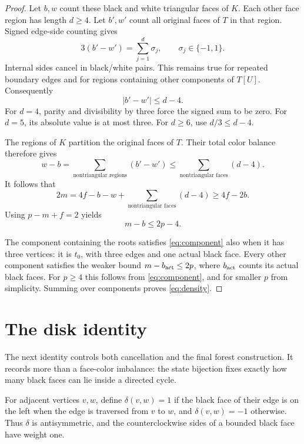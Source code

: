 \documentclass[11pt]{article}
\theoremstyle{remark}
\numberwithin{equation}{section}
\begin{document}
\begin{proof}
Let \(b,w\) count these black and white triangular faces of
\(K\). Each other face region has length \(d\ge4\). Let
\(b',w'\) count all original faces of \(T\) in that region.
Signed edge-side counting gives
\[
 3(b'-w')=\sum_{j=1}^{d}\sigma_j,\qquad
 \sigma_j\in\{-1,1\}.
\]
Internal sides cancel in black/white pairs. This remains true
for repeated boundary edges and for regions containing other
components of \(T[U]\). Consequently
\begin{equation}\label{eq:face-defect}
 \lvert b'-w'\rvert\le d-4.
\end{equation}
For \(d=4\), parity and divisibility by three force the signed
sum to be zero. For \(d=5\), its absolute value is at most
three. For \(d\ge6\), use \(d/3\le d-4\).

The regions of \(K\) partition the original faces of \(T\).
Their total color balance therefore gives
\[
 w-b=\sum_{\text{nontriangular regions}}(b'-w')
       \le\sum_{\text{nontriangular faces}}(d-4).
\]
It follows that
\[
 2m=4f-b-w+\sum_{\text{nontriangular faces}}(d-4)
       \ge4f-2b.
\]
Using \(p-m+f=2\) yields
\begin{equation}\label{eq:component}
 m-b\le2p-4.
\end{equation}

The component containing the roots satisfies
\eqref{eq:component} also when it has three vertices:
it is \(t_0\), with three edges and one actual black face.
Every other component satisfies the weaker bound
\(m-b_{\rm act}\le2p\), where \(b_{\rm act}\) counts its
actual black faces. For \(p\ge4\) this follows from
\eqref{eq:component}, and for smaller \(p\) from simplicity.
Summing over components proves \eqref{eq:density}.
\end{proof}

\section{The disk identity}\label{sec:disk}

The next identity controls both cancellation and the final forest
construction. It records more than a face-color imbalance: the state
bijection fixes exactly how many black faces can lie inside a directed
cycle.

For adjacent vertices \(v,w\), define
\(\delta(v,w)=1\) if the black face of their edge is on the
left when the edge is traversed from \(v\) to \(w\), and
\(\delta(v,w)=-1\) otherwise. Thus \(\delta\) is antisymmetric,
and the counterclockwise sides of a bounded black face have
weight one.
\end{document}
